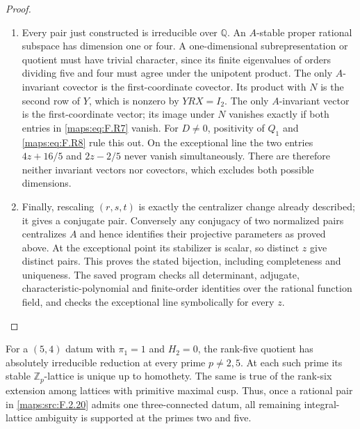 \begin{proof}
\begin{enumerate}[label={$\langle1\rangle$\arabic*.}]
\item Every pair just constructed is irreducible over $\mathbb Q$.
An $A$-stable proper rational subspace has dimension one or
four.  A one-dimensional subrepresentation or quotient must
have trivial character, since its finite eigenvalues of
orders dividing five and four must agree under the
unipotent product.  The only $A$-invariant covector is the
first-coordinate covector.  Its product with $N$ is the
second row of $Y$, which is nonzero by $YRX=I_2$.
The only $A$-invariant vector is the first-coordinate vector;
its image under $N$ vanishes exactly if both entries in
\eqref{maps:eq:F.R7} vanish.  For $D\ne0$, positivity of $Q_1$ and
\eqref{maps:eq:F.R8} rule this out.  On the exceptional line the two
entries $4z+16/5$ and $2z-2/5$ never vanish simultaneously.
There are therefore neither invariant vectors nor covectors,
which excludes both possible dimensions.

\item Finally, rescaling $(r,s,t)$ is exactly the centralizer
change already described; it gives a conjugate pair.
Conversely any conjugacy of two normalized pairs centralizes
$A$ and hence identifies their projective parameters as proved
above.  At the exceptional point its stabilizer is scalar,
so distinct $z$ give distinct pairs.  This proves the stated
bijection, including completeness and uniqueness.
The saved program checks all determinant, adjugate,
characteristic-polynomial and finite-order identities over
the rational function field, and checks the exceptional
line symbolically for every $z$.

\end{enumerate}
\end{proof}




\begin{corollary}\hypertarget{tag-02NB}{}\label{maps:src:F.2.21}


For a $(5,4)$ datum with $\pi_1=1$ and $H_2=0$, the
rank-five quotient has absolutely irreducible reduction
at every prime $p\ne2,5$.  At each such prime its stable
$\mathbb Z_p$-lattice is unique up to homothety.
The same is true of the rank-six extension among lattices
with primitive maximal cusp.  Thus, once a rational pair
in \ref{maps:src:F.2.20} admits one three-connected datum, all remaining integral-lattice
ambiguity is supported at the primes two and five.


\end{corollary}


